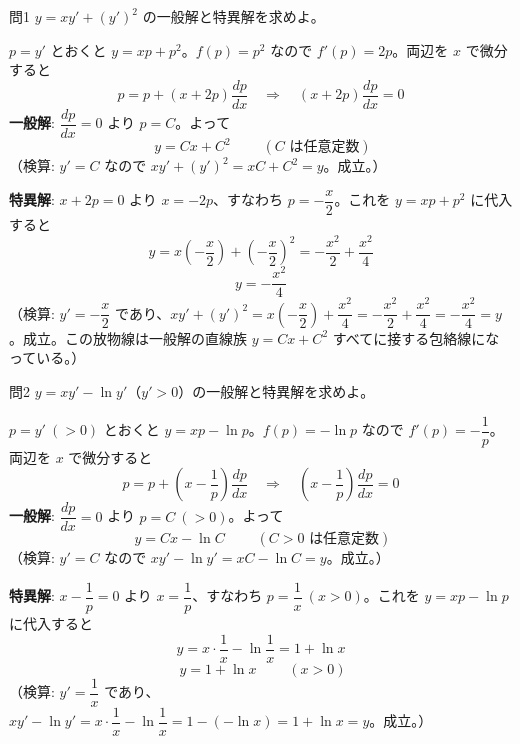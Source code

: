 \documentclass[a4paper,11pt]{article}
\begin{document}
\clearpage
\begin{mondaiboxS}{問1}
$y = xy' + (y')^{2}$ の一般解と特異解を求めよ。
\end{mondaiboxS}
\kaitou
$p = y'$ とおくと $y = xp + p^{2}$。$f(p) = p^{2}$ なので $f'(p) = 2p$。両辺を $x$ で微分すると
\[
p = p + (x + 2p)\frac{dp}{dx}
\quad\Longrightarrow\quad
(x + 2p)\frac{dp}{dx} = 0
\]
\textbf{一般解}: $\dfrac{dp}{dx} = 0$ より $p = C$。よって
\[
\boxed{\; y = Cx + C^{2} \;}
\qquad (C \text{ は任意定数})
\]
（検算: $y' = C$ なので $xy' + (y')^{2} = xC + C^{2} = y$。成立。）

\textbf{特異解}: $x + 2p = 0$ より $x = -2p$、すなわち $p = -\dfrac{x}{2}$。これを $y = xp+p^{2}$ に代入すると
\[
y = x\left(-\frac{x}{2}\right) + \left(-\frac{x}{2}\right)^{2}
= -\frac{x^{2}}{2} + \frac{x^{2}}{4}
\]
\[
\boxed{\; y = -\frac{x^{2}}{4} \;}
\]
（検算: $y' = -\dfrac{x}{2}$ であり、$xy' + (y')^{2} = x\left(-\dfrac{x}{2}\right) + \dfrac{x^{2}}{4} = -\dfrac{x^{2}}{2}+\dfrac{x^{2}}{4} = -\dfrac{x^{2}}{4} = y$。成立。この放物線は一般解の直線族 $y=Cx+C^2$ すべてに接する包絡線になっている。）

\clearpage
\begin{mondaiboxS}{問2}
$y = xy' - \ln y'$（$y' > 0$）の一般解と特異解を求めよ。
\end{mondaiboxS}
\kaitou
$p = y'\ (>0)$ とおくと $y = xp - \ln p$。$f(p) = -\ln p$ なので $f'(p) = -\dfrac{1}{p}$。両辺を $x$ で微分すると
\[
p = p + \left(x - \frac{1}{p}\right)\frac{dp}{dx}
\quad\Longrightarrow\quad
\left(x - \frac{1}{p}\right)\frac{dp}{dx} = 0
\]
\textbf{一般解}: $\dfrac{dp}{dx} = 0$ より $p = C\ (>0)$。よって
\[
\boxed{\; y = Cx - \ln C \;}
\qquad (C > 0 \text{ は任意定数})
\]
（検算: $y' = C$ なので $xy' - \ln y' = xC - \ln C = y$。成立。）

\textbf{特異解}: $x - \dfrac{1}{p} = 0$ より $x = \dfrac{1}{p}$、すなわち $p = \dfrac{1}{x}\ (x > 0)$。これを $y = xp - \ln p$ に代入すると
\[
y = x \cdot \frac{1}{x} - \ln\frac{1}{x} = 1 + \ln x
\]
\[
\boxed{\; y = 1 + \ln x \;}
\qquad (x > 0)
\]
（検算: $y' = \dfrac{1}{x}$ であり、$xy' - \ln y' = x \cdot \dfrac{1}{x} - \ln\dfrac{1}{x} = 1 - (-\ln x) = 1 + \ln x = y$。成立。）
\end{document}
